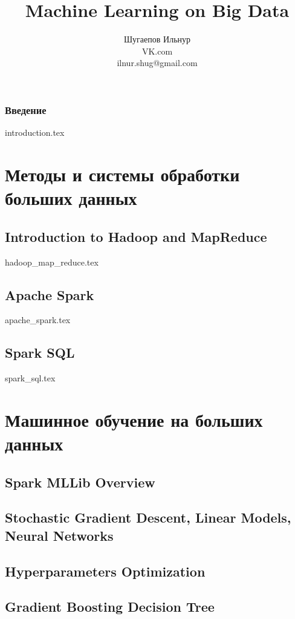 \documentclass[openany,12pt]{book}
\title{Machine Learning on Big Data}
\author{Шугаепов Ильнур 
\\
\small{VK.com} 
\\
\small{ilnur.shug@gmail.com}}
\date{}
\numberwithin{equation}{section}
\begin{document}
\maketitle

\tableofcontents

\section*{Введение}
{introduction.tex}
 
\part{Методы и системы обработки больших данных}
\chapter{Introduction to Hadoop and MapReduce}
{hadoop_map_reduce.tex}


\chapter{Apache Spark}
{apache_spark.tex}

\chapter{Spark SQL}
{spark_sql.tex}

\part{Машинное обучение на больших данных}
\chapter{Spark MLLib Overview}

\chapter{Stochastic Gradient Descent, Linear Models, Neural Networks}

\chapter{Hyperparameters Optimization}

\chapter{Gradient Boosting Decision Tree}
\end{document}
